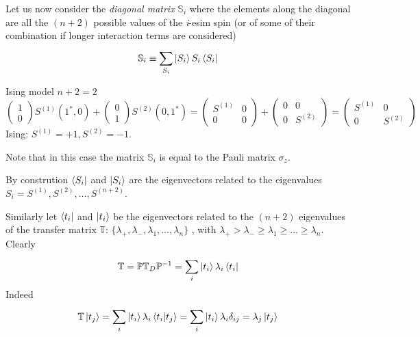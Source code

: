 \documentclass[../main/main.tex]{subfiles}
\begin{document}
Let us now consider  the \emph{diagonal matrix} \( \mathbb{S}_i \) where the elements along the diagonal are all the  \( (n+2) \) possible values of the \emph{i}-esim spin (or of some of their combination if longer interaction terms are considered)
\begin{equation}
  \mathbb{S}_i \equiv  \sum_{S_i}^{} \ket{S_i} S_i \bra{S_i}
\end{equation}
\begin{example}
Ising model \( n+2=2 \)
\begin{equation}
  \begin{pmatrix}
  1 \\
  0
  \end{pmatrix} S^{(1)} (1^*,0) +
  \begin{pmatrix}
  0 \\
  1
  \end{pmatrix} S^{(2)} (0,1^*) =
  \begin{pmatrix}
  S^{(1)}   & 0 \\
  0   & 0
  \end{pmatrix}
  +
  \begin{pmatrix}
  0   & 0 \\
  0   & S^{(2)}
  \end{pmatrix}
  =
  \begin{pmatrix}
  S^{(1)}  & 0 \\
  0   & S^{(2)}
  \end{pmatrix}
\end{equation}
Ising: \( S^{(1)} =+1,S^{(2)}=-1 \).
\end{example}
Note that in this case the matrix \( \mathbb{S}_i \) is equal to the Pauli matrix \( \sigma _z \).
\begin{remark}
By constrution \( \bra{S_i}  \) and \( \ket{S_i}  \) are the eigenvectors related to the eigenvalues \( S_i = S^{(1)},S^{(2)}, \dots,S^{(n+2)} \).
\end{remark}
Similarly let \( \bra{t_i}  \) and \( \ket{t_i}  \) be the eigenvectors related to the \( (n+2) \) eigenvalues of the transfer matrix \( \mathbb{T} \):
   \( \{ \lambda _+,\lambda _-,\lambda _1,\dots,\lambda _n  \}   \) , with \( \lambda _+ > \lambda _- \ge \lambda _1 \ge \dots \ge \lambda _n \).
Clearly
\begin{equation}
  \mathbb{T} = \mathbb{P} \mathbb{T}_D \mathbb{P}^{-1} = \sum_{i}^{} \ket{t_i} \lambda _i \bra{t_i}
\end{equation}
Indeed
\begin{equation}
  \mathbb{T} \ket{t_j} = \sum_{i}^{} \ket{t_i} \lambda _i \braket{t_i}{t_j} = \sum_{i}^{}  \ket{t_i} \lambda _i \delta _{ij} = \lambda _j \ket{t_j}
\end{equation}
\end{document}
